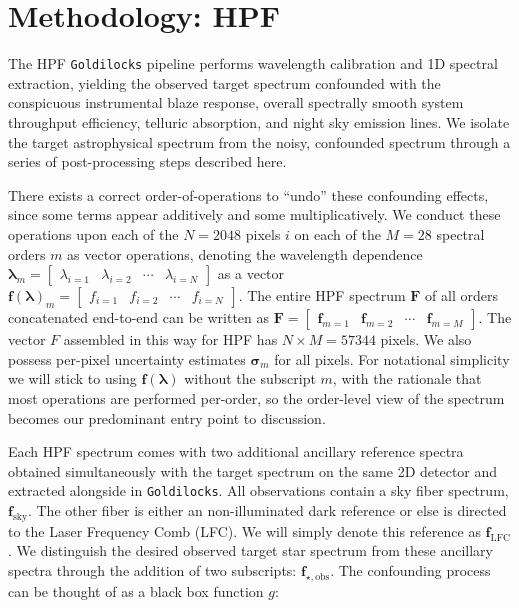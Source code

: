 \documentclass[modern]{aastex631}
\begin{document}
\section{Methodology: HPF}
\label{methods-details}
The HPF \texttt{Goldilocks} pipeline performs wavelength calibration and 1D spectral extraction, yielding the observed target spectrum confounded with the conspicuous instrumental blaze response, overall spectrally smooth system throughput efficiency, telluric absorption, and night sky emission lines.  We isolate the target astrophysical spectrum from the noisy, confounded spectrum through a series of post-processing steps described here.

There exists a correct order-of-operations to ``undo'' these confounding effects, since some terms appear additively and some multiplicatively.  We conduct these operations upon each of the $N=2048$ pixels $i$ on each of the $M=28$ spectral orders $m$ as vector operations, denoting the wavelength dependence $\boldsymbol{\lambda}_m = \begin{bmatrix}\lambda_{i=1} & \lambda_{i=2} & \cdots & \lambda_{i=N} \end{bmatrix}$ as a vector $\mathbf{f(\boldsymbol{\lambda})}_{m} = \begin{bmatrix}f_{i=1} & f_{i=2} & \cdots & f_{i=N} \end{bmatrix}$.  The entire HPF spectrum $\mathbf{F}$ of all orders concatenated end-to-end can be written as $\mathbf{F} = \begin{bmatrix} \mathbf{f}_{m=1} & \mathbf{f}_{m=2} & \cdots & \mathbf{f}_{m=M} \end{bmatrix}$.  The vector $F$ assembled in this way for HPF has $N\times M=57344$ pixels.  We also possess per-pixel uncertainty estimates $\boldsymbol{\sigma}_m$ for all pixels.  For notational simplicity we will stick to using $\mathbf{f(\boldsymbol{\lambda})}$ without the subscript $m$, with the rationale that most operations are performed per-order, so the order-level view of the spectrum becomes our predominant entry point to discussion.

Each HPF spectrum comes with two additional ancillary reference spectra obtained simultaneously with the target spectrum on the same 2D detector and extracted alongside in \texttt{Goldilocks}.  All observations contain a sky fiber spectrum, $\mathbf{f}_{\mathrm{sky}}$.  The other fiber is either an non-illuminated dark reference or else is directed to the Laser Frequency Comb (LFC).  We will simply denote this reference as $\mathbf{f}_{\mathrm{LFC}}$.  We distinguish the desired observed target star spectrum from these ancillary spectra through the addition of two subscripts: $\mathbf{f}_{\star,\mathrm{obs}}$.  The confounding process can be thought of as a black box function $g$:
\end{document}
